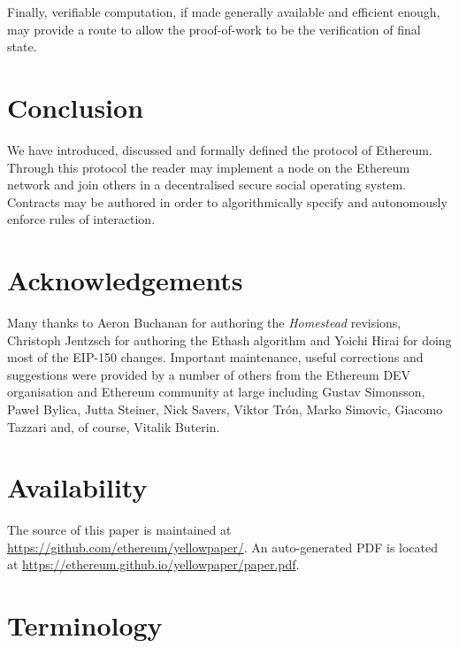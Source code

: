 \documentclass[9pt,oneside]{amsart}
\begin{document}
\begin{multicols}{2}
Finally, verifiable computation, if made generally available and efficient enough, may provide a route to allow the proof-of-work to be the verification of final state.

\section{Conclusion} \label{ch:conclusion}

We have introduced, discussed and formally defined the protocol of Ethereum. Through this protocol the reader may implement a node on the Ethereum network and join others in a decentralised secure social operating system. Contracts may be authored in order to algorithmically specify and autonomously enforce rules of interaction.

\section{Acknowledgements}

Many thanks to Aeron Buchanan for authoring the \textit{Homestead} revisions, Christoph Jentzsch for authoring the Ethash algorithm and Yoichi Hirai for doing most of the EIP-150 changes. Important maintenance, useful corrections and suggestions were provided by a number of others from the Ethereum DEV organisation and Ethereum community at large including Gustav Simonsson, Pawe\l{} Bylica, Jutta Steiner, Nick Savers, Viktor Tr\'{o}n, Marko Simovic, Giacomo Tazzari and, of course, Vitalik Buterin.

\section{Availability}

The source of this paper is maintained at \url{https://github.com/ethereum/yellowpaper/}. An auto-generated PDF is located at \url{https://ethereum.github.io/yellowpaper/paper.pdf}.




\end{multicols}

\appendix

\section{Terminology} \label{ch:Terminology}
\end{document}
